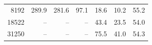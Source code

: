 \begin{tabular}{r | r r r | r r r}
          8192  &     \num{289.9}  &     \num{281.6}  &      \num{97.1}  &      \num{18.6}  &      \num{10.2}  &      \num{55.2} \\ 
         18522  &              --  &              --  &              --  &      \num{43.4}  &      \num{23.5}  &      \num{54.0} \\ 
         31250  &              --  &              --  &              --  &      \num{75.5}  &      \num{41.0}  &      \num{54.3} \\ 

\end{tabular}
